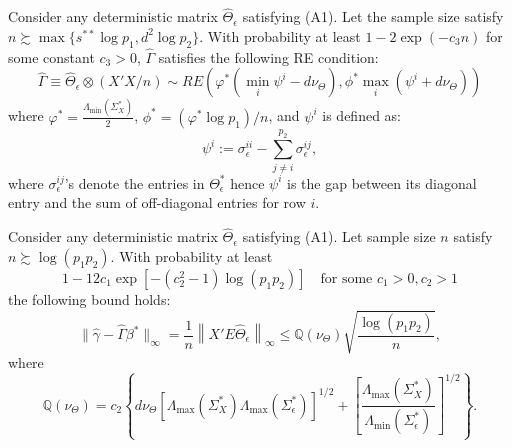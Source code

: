 \begin{proposition}\label{prop:REcondition}
Consider any deterministic matrix $\widehat{\Theta}_{\epsilon}$ satisfying (A1). Let the sample size satisfy $n\succsim \max\{s^{**}\log p_1,d^2\log p_2\}$. With probability at least $1-2\exp(-c_3n)$ for some constant $c_3>0$, $\widehat{\Gamma}$ satisfies the following RE condition:
\begin{equation*}
\widehat{\Gamma} \equiv \widehat{\Theta}_\epsilon\otimes (X'X/n)\sim RE\left(\varphi^*(\min\limits_i\psi^i-d\nu_\Theta), \phi^* \max\limits_i(\psi^i+d\nu_\Theta)\right)
\end{equation*}
where $\varphi^*=\frac{\Lambda_{\min}(\Sigma^*_X)}{2}$, $\phi^*=(\varphi^*\log p_1)/n$, and $\psi^i$ is defined as:
\begin{equation*}
\psi^i:=\sigma^{ii}_\epsilon-\sum_{j\neq i}^{p_2}\sigma^{ij}_\epsilon,
\end{equation*}
where $\sigma^{ij}_\epsilon$'s denote the entries in $\Theta^*_\epsilon$ hence $\psi^i$ is the gap between its diagonal entry and the sum of off-diagonal entries for row $i$.
\end{proposition}

%
%
%
%


\begin{proposition} \label{prop:deviation}
Consider any deterministic matrix $\widehat{\Theta}_{\epsilon}$ satisfying (A1). Let sample size $n$ satisfy $n \succsim \log (p_1p_2)$. With probability at least 
\begin{equation*}
1-12c_1\exp[-(c_2^2-1)\log (p_1p_2)]\quad \text{for some } c_1>0,c_2>1
\end{equation*}
the following bound holds:
\begin{equation*}
\|\widehat{\gamma}-\widehat{\Gamma}\beta^*\|_\infty=\frac{1}{n}\left\|X'E\widehat{\Theta}_\epsilon\right\|_\infty  \leq \mathbb{Q}(\nu_\Theta)\sqrt{\frac{\log (p_1p_2)}{n}},  
\end{equation*}
where
\begin{equation}\label{Q-expression}
\mathbb{Q}(\nu_\Theta)= c_2\left\{ d\nu_\Theta\left[\Lambda_{\max}(\Sigma^*_X)\Lambda_{\max}(\Sigma^*_\epsilon)\right]^{1/2} + \left[ \frac{\Lambda_{\max}(\Sigma_X^*)}{\Lambda_{\min}(\Sigma_\epsilon^*)}\right]^{1/2} \right\} .
\end{equation}
\end{proposition}

